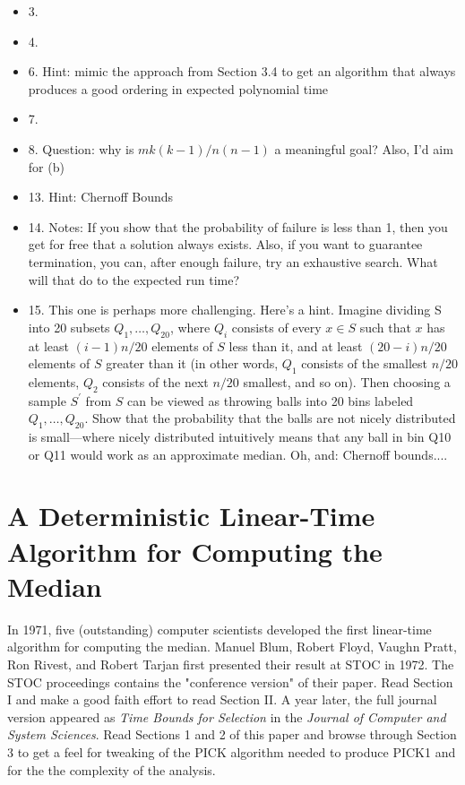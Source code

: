 \documentclass[11pt]{article}
\begin{document}
\begin{itemize}
\item 3.
\item 4.
\item 6. Hint: mimic the approach from Section 3.4 to get an algorithm that always produces a good ordering in expected polynomial time
\item 7.
\item 8. Question: why is $m k (k - 1) / n (n - 1)$ a meaningful goal? Also, I'd aim for (b)
\item 13. Hint: Chernoff Bounds
\item 14. Notes: If you show that the probability of failure is less than 1, then you get for free that a solution always exists. Also, if you want to guarantee termination, you can, after enough failure, try an exhaustive search. What will that do to
the expected run time?
\item 15. This one is perhaps more challenging.  Here's a hint. Imagine dividing S into 20 subsets $Q_1, \ldots, Q_{20}$,
where $Q_i$ consists of every $x \in S$ such that $x$ has at least $(i - 1) n / 20$ elements of $S$ less than it, and at least
$(20 - i) n /20$ elements of $S$ greater than it (in other words, $Q_1$ consists of the smallest $n/20$ elements, $Q_2$ consists of the next $n/20$ smallest, and so on).  Then choosing a sample $S^\prime$ from $S$ can be viewed as throwing balls into 20 bins labeled $Q_1, \ldots, Q_{20}$. Show that the probability that the balls are not nicely distributed is small---where nicely distributed intuitively means that any ball in bin Q10 or Q11 would work as an approximate median. Oh, and: Chernoff bounds....
\end{itemize}

\section{A Deterministic Linear-Time Algorithm for Computing the Median}
In 1971, five (outstanding) computer scientists developed the first linear-time algorithm for computing the median.  Manuel Blum, Robert Floyd, Vaughn Pratt, Ron Rivest, and Robert Tarjan first presented their result at STOC in 1972.  The STOC proceedings contains the "conference version" of their paper.  Read Section I and make a good faith effort to read Section II.  A year later, the full journal version appeared as {\em Time Bounds for Selection} in the
{\em Journal of Computer and System Sciences}.  Read Sections 1 and 2 of this paper and browse through Section 3 to get a feel for tweaking of the PICK algorithm needed to produce PICK1 and for the the complexity of the analysis.
\end{document}
